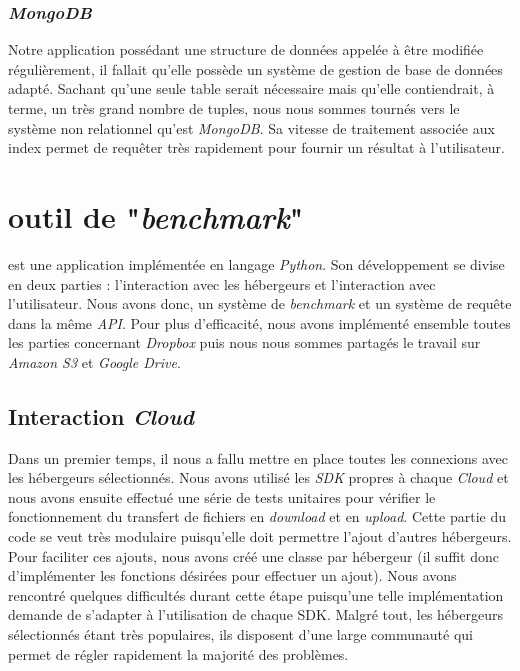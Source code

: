 \documentclass[10pt]{article}
\begin{document}
\subsubsection{\textit{MongoDB}}

Notre application possédant une structure de données appelée à être modifiée
régulièrement, il fallait qu'elle possède un système de gestion de base de
données adapté. Sachant qu'une seule table serait nécessaire mais qu'elle
contiendrait, à terme, un très grand nombre de tuples, nous nous sommes tournés
vers le système non relationnel qu'est \textit{MongoDB}. Sa vitesse de
traitement associée aux index permet de requêter très rapidement pour fournir
un résultat à l'utilisateur.

\section{\KYD outil de "\textit{benchmark}" }

\KYD est une application implémentée en langage \textit{Python}. Son
développement se divise en deux parties : l'interaction avec les hébergeurs et
l'interaction avec l'utilisateur. Nous avons donc, un système de
\textit{benchmark} et un système de requête dans la même \textit{API}. Pour plus
d'efficacité, nous avons implémenté ensemble toutes les parties concernant
\textit{Dropbox} puis nous nous sommes partagés le travail sur \textit{Amazon
S3} et \textit{Google Drive}.

\subsection{Interaction \textit{Cloud}}

Dans un premier temps, il nous a fallu mettre en place toutes les connexions
avec les hébergeurs sélectionnés. Nous avons utilisé les \textit{SDK} propres à
chaque \textit{Cloud} et nous avons ensuite effectué une série de tests
unitaires pour vérifier le fonctionnement du transfert de fichiers en
\textit{download} et en \textit{upload}. Cette partie du code se veut très modulaire puisqu'elle doit permettre l'ajout
d'autres hébergeurs. Pour faciliter ces ajouts, nous avons créé une classe par
hébergeur (il suffit donc d'implémenter les fonctions désirées pour effectuer un
ajout). Nous avons rencontré quelques difficultés durant cette étape puisqu'une
telle implémentation demande de s'adapter à l'utilisation de chaque SDK. Malgré
tout, les hébergeurs sélectionnés étant très populaires, ils disposent d'une
large communauté qui permet de régler rapidement la majorité des problèmes.
\end{document}
